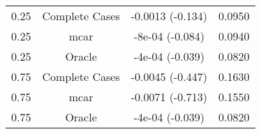 \begin{table}[ht]
\centering
\begin{tabular}{cccc}
  \hline
  \hline
0.25 & Complete Cases & -0.0013 (-0.134) & 0.0950 \\ 
  0.25 & mcar & -8e-04 (-0.084) & 0.0940 \\ 
  0.25 & Oracle & -4e-04 (-0.039) & 0.0820 \\ 
  0.75 & Complete Cases & -0.0045 (-0.447) & 0.1630 \\ 
  0.75 & mcar & -0.0071 (-0.713) & 0.1550 \\ 
  0.75 & Oracle & -4e-04 (-0.039) & 0.0820 \\ 
   \hline
\end{tabular}
\end{table}

